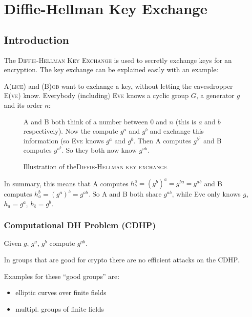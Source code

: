 \chapter{Diffie-Hellman Key Exchange}

\section{Introduction}

The \textsc{Diffie-Hellman Key Exchange} is used to secretly exchange keys for an encryption. The key exchange can be explained easily with an example:

\textsc{A(lice)} and \textsc{(B)ob} want to exchange a key, without letting the eavesdropper \textsc{E(ve)} know. Everybody (including) \textsc{Eve} knows a cyclic group $G$, a generator $g$ and its order $n$:

\begin{figure}[H]
  \caption{Illustration of the\textsc{Diffie-Hellman key exchange}}{\textsc{A} and \textsc{B} both think of a number between $0$ and $n$ (this is $a$ and $b$ respectively). Now the compute $g^a$ and $g^b$ and exchange this information (so \textsc{Eve} knows $g^a$ and $g^b$. Then \textsc{A} computes $g^{b^a}$ and \textsc{B} computes $g^{a^b}$. So they both now know $g^{ab}$.}
  \label{fig:DH}
\end{figure}

In summary, this means that \textsc{A} computes $h_b^a = (g^b)^a = g^{ba} = g^{ab}$ and \textsc{B} computes $h_a^b = (g^a)^b = g^{ab}$. So \textsc{A} and \textsc{B} both share $g^{ab}$, while Eve only knows $g$, $h_a = g^a$, $h_b =g^b$.

\subsection{Computational DH Problem (CDHP)}

Given $g$, $g^a$, $g^b$ compute $g^{ab}$.

In groups that are good for crypto there are no efficient attacks on the \textsc{CDHP}.

\begin{example} Examples for these ``good groups'' are:
\begin{itemize}
\item elliptic curves over finite fields
\item multipl. groups of finite fields
\end{itemize}
\end{example}

